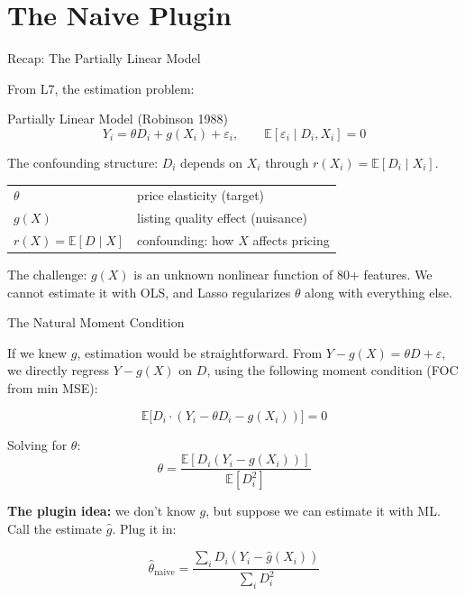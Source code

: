 \documentclass[aspectratio=169, 11pt, handout]{beamer}
\newcommand{\E}{\mathbb{E}}
\begin{document}

\section{The Naive Plugin}

\begin{frame}{Recap: The Partially Linear Model}

From L7, the estimation problem:

\begin{block}{Partially Linear Model (Robinson 1988)}
\[
Y_i = \theta D_i + g(X_i) + \varepsilon_i, \qquad \E[\varepsilon_i \mid D_i, X_i] = 0
\]
\end{block}

The confounding structure: $D_i$ depends on $X_i$ through $r(X_i) = \E[D_i \mid X_i]$.

\bigskip

\begin{tabular}{ll}
$\theta$ & price elasticity (target) \\
$g(X)$ & listing quality effect (nuisance) \\
$r(X) = \E[D \mid X]$ & confounding: how $X$ affects pricing \\
\end{tabular}

\bigskip
\pause

The challenge: $g(X)$ is an unknown nonlinear function of 80+ features. We cannot estimate it with OLS, and Lasso regularizes $\theta$ along with everything else.

\end{frame}

\begin{frame}{The Natural Moment Condition}

If we knew $g$, estimation would be straightforward. From $Y - g(X) = \theta D + \varepsilon$, we directly regress $Y - g(X)$ on $D$, using the following moment condition (FOC from min MSE):

\[
\E\bigl[D_i \cdot (Y_i - \theta D_i - g(X_i))\bigr] = 0
\]

\pause
\bigskip

Solving for $\theta$:
\[
\theta = \frac{\E[D_i(Y_i - g(X_i))]}{\E[D_i^2]}
\]

\pause
\bigskip

\textbf{The plugin idea:} we don't know $g$, but suppose we can estimate it with ML. Call the estimate $\hat{g}$. Plug it in:

\[
\hat{\theta}_{\text{naive}} = \frac{\sum_i D_i(Y_i - \hat{g}(X_i))}{\sum_i D_i^2}
\]

\end{frame}
\end{document}
